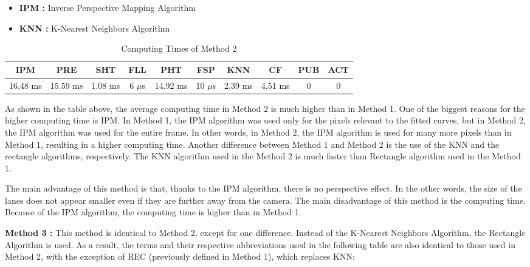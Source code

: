 \begin{itemize}[noitemsep]
\item\textbf{IPM : }Inverse Perspective Mapping Algorithm
\item\textbf{KNN : }K-Nearest Neighbors Algorithm
\end{itemize}


\begin{table}[ht]
\caption{Computing Times of Method 2} 
\centering 
  \begin{tabular}{ | c | c | c | c | c | c | c | c | c | c |}
    \hline
  
  IPM 		& PRE 		& SHT	   & FLL 	   & PHT 	   & FSP 	    & KNN 	   & CF 	  & PUB 	& ACT \\ \hline  
  16.48 ms & 15.59 ms & 1.08 ms & 6 $\mu$s & 14.92 ms & 10 $\mu$s & 2.39 ms & 4.51 ms & 0       & 0   \\ \hline  
    
      \end{tabular}
  \label{tab:Case2_Times}
\end{table}

As shown in the table above, the average computing time in Method 2 is much higher than in Method 1. One of the biggest reasons for the higher computing time is IPM. In Method 1, the IPM algorithm was used only for the pixels relevant to the fitted curves, but in Method 2, the IPM algorithm was used for the entire frame. In other words, in Method 2, the IPM algorithm is used for many more pixels than in Method 1, resulting in a higher computing time. Another difference between Method 1 and Method 2 is the use of the KNN and the rectangle algorithms, respectively. The KNN algorithm used in the Method 2 is much faster than Rectangle algorithm used in the Method 1.

The main advantage of this method is that, thanks to the IPM algorithm, there is no perspective
effect. In the other words, the size of the lanes does not appear smaller even if they are further away from the camera. The main disadvantage of this method is the computing time. Because of the IPM algorithm, the computing time is higher than in Method 1.



\textbf{Method 3 : }This method is identical to Method 2, except for one difference. Instead of the
K-Nearest Neighbors Algorithm, the Rectangle Algorithm is used. As a result, the terms and their respective abbreviations used in the following table are also identical to those used in Method 2, with the exception of REC (previously defined in Method 1), which replaces KNN:


